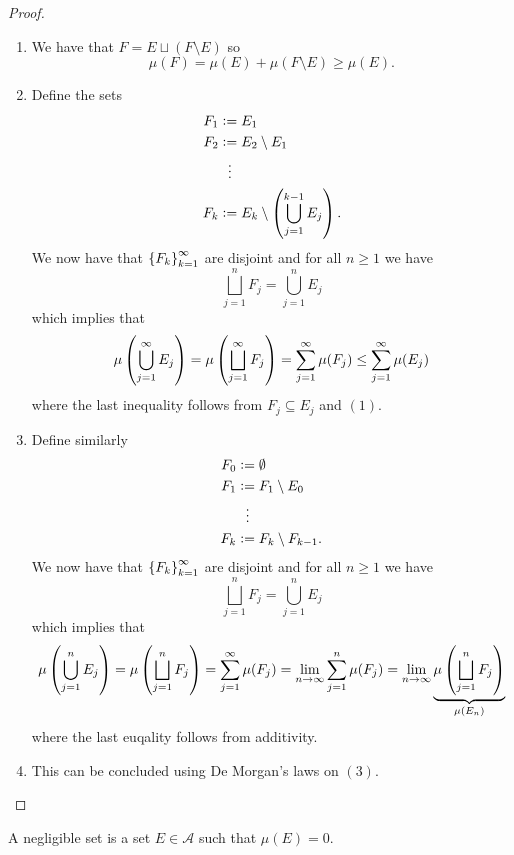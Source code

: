 \documentclass[11pt,a4paper]{article}
\newcommand{\A}{\mathcal A}
\begin{document}
\begin{proof} \phantom{}
\begin{enumerate}
  \item[(1)] We have that $F = E \sqcup (F \setminus E)$ so
    \[
      \mu(F) = \mu(E) + \mu(F \setminus E) \geq \mu(E).
    \]
  \item[(2)] Define the sets
    \begin{align*}
      F_1 &:= E_1 \\
      F_2 &:= E_2 \setminus E_1 \\
      &\vdotswithin{:=} \\
      F_k &:= E_k \setminus \del{\bigcup_{j=1}^{k-1} E_j}.
    \end{align*}
    We now have that $\left\{F_k\right\}_{k=1}^{\infty}$ are disjoint and
    for all $n \geq 1$ we have
    \[
      \bigsqcup_{j=1}^{n} F_j =
      \bigcup_{j=1}^{n} E_j
    \]
    which implies that
    \[
      \mu\del{\bigcup_{j=1}^{\infty} E_j} =
      \mu\del{\bigsqcup_{j=1}^{\infty} F_j} =
      \sum_{j=1}^{\infty} \mu(F_j) \le
      \sum_{j=1}^{\infty} \mu(E_j)
    \]
    where the last inequality follows from $F_j \subseteq E_j$ and $(1)$.
  \item[(3)] Define similarly
    \begin{align*}
      F_0 &:= \emptyset \\
      F_1 &:= F_1 \setminus E_0 \\
      &\vdotswithin{:=} \\
      F_k &:= F_k \setminus F_{k-1}.
    \end{align*}
    We now have that $\left\{F_k\right\}_{k=1}^{\infty}$ are disjoint and
    for all $n \geq 1$ we have
    \[
      \bigsqcup_{j=1}^{n} F_j =
      \bigcup_{j=1}^{n} E_j
    \]
    which implies that
    \[
      \mu\del{\bigcup_{j=1}^{n} E_j} =
      \mu\del{\bigsqcup_{j=1}^{n} F_j} =
      \sum_{j=1}^{\infty} \mu(F_j) =
      \lim_{n \to \infty} \sum_{j=1}^{n} \mu(F_j) =
      \lim_{n \to \infty}
      \underbrace{\mu\del{\bigsqcup_{j=1}^{n} F_j}}_{\mu(E_n)}
    \]
    where the last euqality follows from additivity.
  \item[(4)] This can be concluded using De Morgan's laws on $(3)$.
\end{enumerate}
\end{proof}

\begin{definition}
  A negligible set is a set $E \in \A$ such that $\mu(E) = 0$.
\end{definition}
\end{document}
